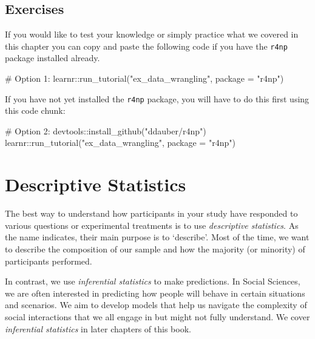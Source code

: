 \documentclass[
  letterpaper,
  DIV=11,
  numbers=noendperiod]{scrreprt}
\newenvironment{Shaded}{\begin{snugshade}}{\end{snugshade}}
\newcommand{\AttributeTok}[1]{\textcolor[rgb]{0.40,0.45,0.13}{#1}}
\newcommand{\CommentTok}[1]{\textcolor[rgb]{0.37,0.37,0.37}{#1}}
\newcommand{\FunctionTok}[1]{\textcolor[rgb]{0.28,0.35,0.67}{#1}}
\newcommand{\NormalTok}[1]{\textcolor[rgb]{0.00,0.23,0.31}{#1}}
\newcommand{\SpecialCharTok}[1]{\textcolor[rgb]{0.37,0.37,0.37}{#1}}
\newcommand{\StringTok}[1]{\textcolor[rgb]{0.13,0.47,0.30}{#1}}
\begin{document}
\section{Exercises}\label{sec-exercises-data-wrangling}

If you would like to test your knowledge or simply practice what we
covered in this chapter you can copy and paste the following code if you
have the \texttt{r4np} package installed already.

\begin{Shaded}
\begin{Highlighting}[]
\CommentTok{\# Option 1:}
\NormalTok{learnr}\SpecialCharTok{::}\FunctionTok{run\_tutorial}\NormalTok{(}\StringTok{"ex\_data\_wrangling"}\NormalTok{, }\AttributeTok{package =} \StringTok{"r4np"}\NormalTok{)}
\end{Highlighting}
\end{Shaded}

If you have not yet installed the \texttt{r4np} package, you will have
to do this first using this code chunk:

\begin{Shaded}
\begin{Highlighting}[]
\CommentTok{\# Option 2:}
\NormalTok{devtools}\SpecialCharTok{::}\FunctionTok{install\_github}\NormalTok{(}\StringTok{"ddauber/r4np"}\NormalTok{)}
\NormalTok{learnr}\SpecialCharTok{::}\FunctionTok{run\_tutorial}\NormalTok{(}\StringTok{"ex\_data\_wrangling"}\NormalTok{, }\AttributeTok{package =} \StringTok{"r4np"}\NormalTok{)}
\end{Highlighting}
\end{Shaded}


\chapter{Descriptive Statistics}\label{sec-descriptive-statistics}

The best way to understand how participants in your study have responded
to various questions or experimental treatments is to use
\emph{descriptive statistics}. As the name indicates, their main purpose
is to `describe'. Most of the time, we want to describe the composition
of our sample and how the majority (or minority) of participants
performed.

In contrast, we use \emph{inferential statistics} to make predictions.
In Social Sciences, we are often interested in predicting how people
will behave in certain situations and scenarios. We aim to develop
models that help us navigate the complexity of social interactions that
we all engage in but might not fully understand. We cover
\emph{inferential statistics} in later chapters of this book.
\end{document}
